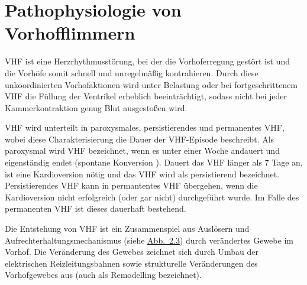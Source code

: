
\section{Pathophysiologie von Vorhofflimmern}\label{sec:Vorhofflimmern}

\gls{VHF} ist eine Herzrhythmusstörung, bei der die Vorhoferregung gestört ist und die Vorhöfe somit schnell und unregelmäßig kontrahieren. Durch diese unkoordinierten Vorhofaktionen wird unter Belastung oder bei fortgeschrittenem \gls{VHF} die Füllung der Ventrikel erheblich beeinträchtigt, sodass nicht bei jeder Kammerkontraktion genug Blut ausgestoßen wird. \cite{rizwan_review_2021}

\gls{VHF} wird unterteilt in paroxysmales, persistierendes und permanentes \gls{VHF}, wobei diese Charakterisierung die Dauer der \gls{VHF}-Episode beschreibt. Als paroxysmal wird \gls{VHF} bezeichnet, wenn es unter einer Woche andauert und eigenständig endet (spontane Konversion \cite{gertsch_ekg_2007}). Dauert das \gls{VHF} länger als 7 Tage an, ist eine Kardioversion nötig und das \gls{VHF} wird als persistierend bezeichnet. Persistierendes \gls{VHF} kann in permantentes \gls{VHF} übergehen, wenn die Kardioversion nicht erfolgreich (oder gar nicht) durchgeführt wurde. Im Falle des permanenten \gls{VHF} ist dieses dauerhaft bestehend. \cite{erdmann_klinische_2011} 

Die Entstehung von \gls{VHF} ist ein Zusammenspiel aus Auslösern und Aufrechterhaltungsmechanismus (siehe \hyperref[fig:VHFschematic]{Abb.~2.3}) durch verändertes Gewebe im Vorhof. Die Veränderung des Gewebes zeichnet sich durch Umbau der elektrischen Reizleitungsbahnen sowie strukturelle Veränderungen des Vorhofgewebes aus (auch als Remodelling bezeichnet). \cite{wijesurendra_mechanisms_2019} 

